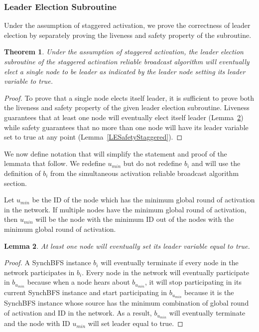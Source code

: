 \documentclass[english]{article}
\newtheorem{theorem}{Theorem}[section]
\newtheorem{lemma}[theorem]{Lemma}
\begin{document}
\subsubsection{Leader Election Subroutine}

Under the assumption of staggered activation, we prove the correctness of leader election by separately proving the liveness and safety property of the subroutine.

\begin{theorem}
\label{LeaderElectionStaggered}
Under the assumption of staggered activation, the leader election subroutine of the staggered activation reliable broadcast algorithm will eventually elect a single node to be leader as indicated by the leader node setting its leader variable to true.
\end{theorem}
\begin{proof}
To prove that a single node elects itself leader, it is sufficient to prove both the liveness and safety property of the given leader election subroutine. Liveness guarantees that at least one node will eventually elect itself leader (Lemma~\ref{LELivenessStaggered}) while safety guarantees that no more than one node will have its leader variable set to true at any point (Lemma~\ref{LESafetyStaggered}).

\end{proof}

We now define notation that will simplify the statement and proof of the lemmata that follow. We redefine $u_{min}$ but do not redefine $b_i$ and will use the definition of $b_i$ from the simultaneous activation reliable broadcast algorithm section.


\begin{definition}
Let $u_{min}$ be the ID of the node which has the minimum global round of activation in the network. If multiple nodes have the minimum global round of activation, then $u_{min}$ will be the node with the minimum ID out of the nodes with the minimum global round of activation.
\end{definition}


\begin{lemma}
\label{LELivenessStaggered}
 At least one node will eventually set its leader variable equal to true.
\end{lemma}
\begin{proof}

A SynchBFS instance $b_i$ will eventually terminate if every node in the network participates in $b_i$. 
Every node in the network will eventually participate in $b_{u_{min}}$ because when a node hears about $b_{u_{min}}$, it will stop participating in its current SynchBFS instance and start participating in $b_{u_{min}}$ because it is the SynchBFS instance whose source has the minimum combination of global round of activation and ID in the network. As a result, $b_{u_{min}}$ will eventually terminate and the node with ID $u_{min}$ will set leader equal to true.
\end{proof}
\end{document}
